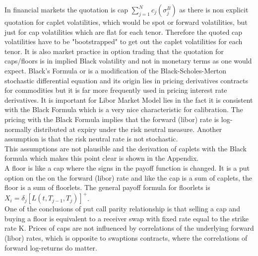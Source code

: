 \documentclass[11pt]{article}
\numberwithin{equation}{subsection}
\begin{document}
In financial markets the quotation is cap \(\sum_{j=1}^{N} c_{j}(\sigma_{j}^{B})\) as there is non explicit quotation for caplet volatilities, which would be spot or forward volatilities, but just for cap volatilities which are flat for each tenor. Therefore the quoted cap volatilities have to be "bootstrapped" to get out the caplet volatilities for each tenor. It is also market practice in option trading that the quotation for caps/floors is in implied Black volatility and not in monetary terms as one would expect.
Black's Formula or is a modification of the Black-Scholes-Merton stochastic differential equation and its origin lies in pricing derivatives contracts for commodities but it is far more frequently used in pricing interest rate derivatives. It is important for Libor Market Model lies in the fact it is consistent with the Black Formula which is a very nice characteristic for calibration. The pricing with the Black Formula implies that the forward (libor) rate is log-normally distributed at expiry under the risk neutral measure. Another assumption is that the risk neutral rate is not stochastic.\\
This assumptions are not plausible and the derivation of caplets with the Black formula which makes this point clear is shown in the Appendix.\\
A floor is like a cap where the signs in the payoff function is changed. It is a put option on the on the forward (libor) rate and like the cap is a sum of caplets, the floor is a sum of floorlets. The general payoff formula for floorlets is \(X_i=\delta_{j}[L(t, T_{j-1}, T_{j})]^{+}\).\\
One of the conclusions of put call parity relationship is that selling a cap and buying a floor is equivalent to a receiver swap with fixed rate equal to the strike rate K. Prices of caps are not influenced by correlations of the underlying forward (libor) rates, which is opposite to swaptions contracts, where the correlations of forward log-returns do matter.
\end{document}
